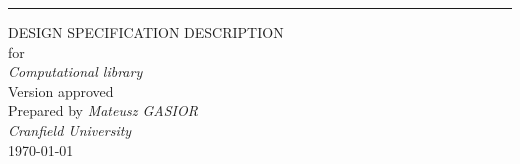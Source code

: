 \begin{flushright}
    \rule{16cm}{5pt}\vskip1cm
    \begin{bfseries}
        \Huge{DESIGN SPECIFICATION DESCRIPTION}\\
        \vspace{1.9cm}
        for\\
        \vspace{1.9cm}
	    \textit{Computational library}\\
        \vspace{1.9cm}
        \LARGE{Version \myversion approved}\\
        \vspace{1.9cm}
        Prepared by \textit{Mateusz GASIOR}\\
        \vspace{1.9cm}
        \textit{Cranfield University}\\
        \vspace{1.9cm}
        \today\\
    \end{bfseries}
\end{flushright}